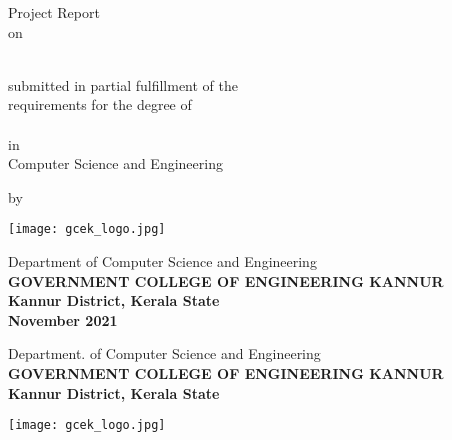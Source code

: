 \begin{titlepage}
\begin{center}

	{ \LARGE Project Report }\\\medskip
	{ on }\\\bigskip
	{\huge \nameOfProject \\}	
    
\vspace{2.6cm}

	{\sc submitted in partial fulfillment of the \\ requirements for the degree of}\\\medskip
	\\\medskip
	{\sc in \\ Computer Science and Engineering} 

\vspace{1cm}

	{\sc by}\\\medskip
	\membertable
	
\vfill

\centerline{\texttt{[image: gcek\_logo.jpg]}}


\vspace{0.7cm}
{{\sc Department of Computer Science and Engineering}}\\
{\bf \MakeUppercase{Government College  of Engineering Kannur}}\\ 
{\bf Kannur District, Kerala State}\\
{\bf November 2021}
	
\end{center}
\end{titlepage}


\cleardoublepage


\begin{center}
     { {\sc Department. of Computer Science and Engineering}}\\
     {\bf \MakeUppercase{Government College  of Engineering Kannur}}\\
     {\bf Kannur District, Kerala State}\\ \bigskip   
        
      \vspace*{25pt}
      \centerline{\texttt{[image: gcek\_logo.jpg]}}
      \vspace*{2cm}
      \textbf{\large {}}
      \vspace*{1cm}     
\end{center}

